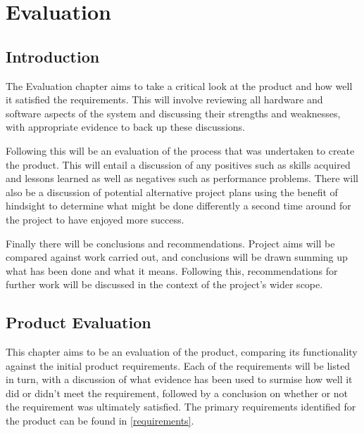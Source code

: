 \part{Evaluation}
	\chapter{Introduction}
	The Evaluation chapter aims to take a critical look at the product and how well it satisfied the requirements. This will involve reviewing all hardware and software aspects of the system and discussing their strengths and weaknesses, with appropriate evidence to back up these discussions. 
	
	Following this will be an evaluation of the process that was undertaken to create the product. This will entail a discussion of any positives such as skills acquired and lessons learned as well as negatives such as performance problems. There will also be a discussion of potential alternative project plans using the benefit of hindsight to determine what might be done differently a second time around for the project to have enjoyed more success.
	
	Finally there will be conclusions and recommendations. Project aims will be compared against work carried out, and conclusions will be drawn summing up what has been done and what it means. Following this, recommendations for further work will be discussed in the context of the project's wider scope.
	
	\chapter{Product Evaluation}
	This chapter aims to be an evaluation of the product, comparing its functionality against the initial product requirements. Each of the requirements will be listed in turn, with a discussion of what evidence has been used to surmise how well it did or didn't meet the requirement, followed by a conclusion on whether or not the requirement was ultimately satisfied. The primary requirements identified for the product can be found in \ref{requirements}.
	
